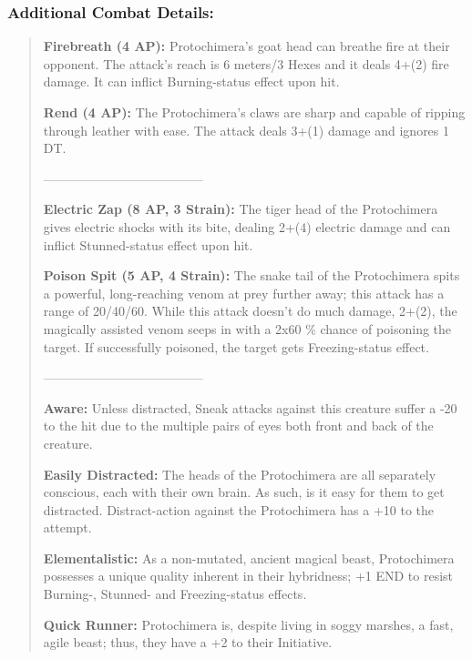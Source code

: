 \documentclass[11pt,a4paper,twocolumn]{book}
\begin{document}
	\subsubsection*{Additional Combat Details:}
	\begin{verse}
		\textbf{Firebreath (4 AP):} Protochimera's goat head can breathe fire at their opponent. The attack's reach is 6 meters/3 Hexes and it deals 4+(2) fire damage. It can inflict Burning-status effect upon hit.
		
		\textbf{Rend (4 AP):} The Protochimera's claws are sharp and capable of ripping through leather with ease. The attack deals 3+(1) damage and ignores 1 DT.
		
	--------------------------------------	
		
		\textbf{Electric Zap (8 AP, 3 Strain):} The tiger head of the Protochimera gives electric shocks with its bite, dealing 2+(4) electric damage and can inflict Stunned-status effect upon hit.
	
		\textbf{Poison Spit (5 AP, 4 Strain):} The snake tail of the Protochimera spits a powerful, long-reaching venom at prey further away; this attack has a range of 20/40/60. While this attack doesn't do much damage, 2+(2), the magically assisted venom seeps in with a 2x60 \% chance of poisoning the target. If successfully poisoned, the target gets Freezing-status effect.
	
		--------------------------------------
	
		\textbf{Aware:} Unless distracted, Sneak attacks against this creature suffer a -20 to the hit due to the multiple pairs of eyes both front and back of the creature.
	
		\textbf{Easily Distracted:} The heads of the Protochimera are all separately conscious, each with their own brain. As such, is it easy for them to get distracted. Distract-action against the Protochimera has a +10 to the attempt.
		
		\textbf{Elementalistic:} As a non-mutated, ancient magical beast, Protochimera possesses a unique quality inherent in their hybridness; +1 END to resist Burning-, Stunned- and Freezing-status effects.
	
		\textbf{Quick Runner:} Protochimera is, despite living in soggy marshes, a fast, agile beast; thus, they have a +2 to their Initiative.

%		
		
	\end{verse}
\end{document}
